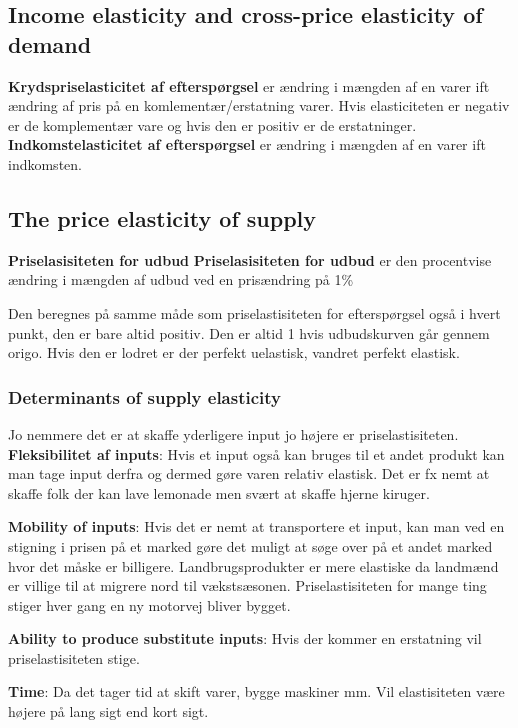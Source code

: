 \subsection{Income elasticity and cross-price elasticity of demand}
\textbf{Krydspriselasticitet af efterspørgsel} er ændring i mængden af en varer ift ændring af pris på en komlementær/erstatning varer. Hvis elasticiteten er negativ er de komplementær vare og hvis den er positiv er de erstatninger. 
\textbf{Indkomstelasticitet af efterspørgsel} er ændring i mængden af en varer ift indkomsten.

\subsection{The price elasticity of supply}
\begin{defn}\textbf{Priselasisiteten for udbud} %
\newline
\textbf{Priselasisiteten for udbud} er den procentvise ændring i mængden af udbud ved en prisændring på 1\%
\end{defn}
Den beregnes på samme måde som priselastisiteten for efterspørgsel også i hvert punkt, den er bare altid positiv. Den er altid 1 hvis udbudskurven går gennem origo. Hvis den er lodret er der perfekt uelastisk, vandret perfekt elastisk.

\subsubsection{Determinants of supply elasticity}
Jo nemmere det er at skaffe yderligere input jo højere er priselastisiteten. 
\textbf{Fleksibilitet af inputs}: Hvis et input også kan bruges til et andet produkt kan man tage input derfra og dermed gøre varen relativ elastisk. Det er fx nemt at skaffe folk der kan lave lemonade men svært at skaffe hjerne kiruger. 

\textbf{Mobility of inputs}: Hvis det er nemt at transportere et input, kan man ved en stigning i prisen på et marked gøre det muligt at søge over på et andet marked hvor det måske er billigere. Landbrugsprodukter  er mere elastiske da landmænd er villige til at migrere nord til vækstsæsonen. Priselastisiteten for mange ting stiger hver gang en ny motorvej bliver bygget.

\textbf{Ability to produce substitute inputs}: Hvis der kommer en erstatning vil priselastisiteten stige.

\textbf{Time}: Da det tager tid at skift varer, bygge maskiner mm. Vil elastisiteten være højere på lang sigt end kort sigt.

